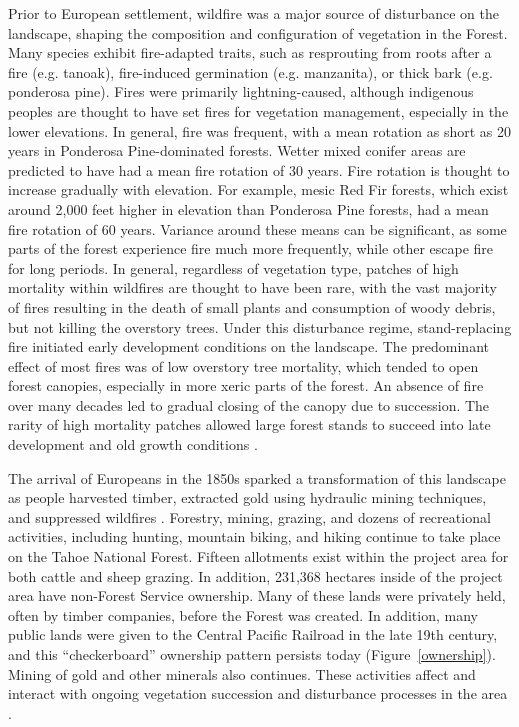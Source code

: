 Prior to European settlement, wildfire was a major source of disturbance on the landscape, shaping the composition and configuration of vegetation in the Forest. Many species exhibit fire-adapted traits, such as resprouting from roots after a fire (e.g. tanoak), fire-induced germination (e.g. manzanita), or thick bark (e.g. ponderosa pine). Fires were primarily lightning-caused, although indigenous peoples are thought to have set fires for vegetation management, especially in the lower elevations. In general, fire was frequent, with a mean rotation as short as 20 years in Ponderosa Pine-dominated forests. Wetter mixed conifer areas are predicted to have had a mean fire rotation of 30 years. Fire rotation is thought to increase gradually with elevation. For example, mesic Red Fir forests, which exist around 2,000 feet higher in elevation than Ponderosa Pine forests, had a mean fire rotation of 60 years. Variance around these means can be significant, as some parts of the forest experience fire much more frequently, while other escape fire for long periods. In general, regardless of vegetation type, patches of high mortality within wildfires are thought to have been rare, with the vast majority of fires resulting in the death of small plants and consumption of woody debris, but not killing the overstory trees. Under this disturbance regime, stand-replacing fire initiated early development conditions on the landscape. The predominant effect of most fires was of low overstory tree mortality, which tended to open forest canopies, especially in more xeric parts of the forest. An absence of fire over many decades led to gradual closing of the canopy due to succession. The rarity of high mortality patches allowed large forest stands to succeed into late development and old growth conditions \citep{SNEP1996,Mallek2013,Safford2014,SNEP1996a}.

The arrival of Europeans in the 1850s sparked a transformation of this landscape as people harvested timber, extracted gold using hydraulic mining techniques, and suppressed wildfires \citep{Storer1963}. Forestry, mining, grazing, and dozens of recreational activities, including hunting, mountain biking, and hiking continue to take place on the Tahoe National Forest. Fifteen allotments exist within the project area for both cattle and sheep grazing. In addition, 231,368 hectares inside of the project area have non-Forest Service ownership. Many of these lands were privately held, often by timber companies, before the Forest was created. In addition, many public lands were given to the Central Pacific Railroad in the late 19th century, and this ``checkerboard'' ownership pattern persists today (Figure~\ref{ownership}). Mining of gold and other minerals also continues. These activities affect and interact with ongoing vegetation succession and disturbance processes in the area \citep{USDAForestService2014}.


